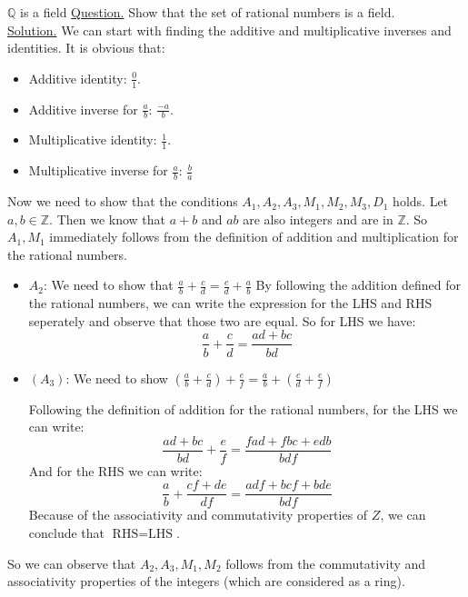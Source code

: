 \begin{example}{$ \mathbb{Q} $ is a field}
	\underline{Question.} Show that the set of rational numbers is a field.  \\
	
	\underline{Solution.} We can start with finding the additive and multiplicative inverses and identities. It is obvious that:
	\begin{itemize}
		\item Additive identity: $ \frac{0}{1} $.
		\item Additive inverse for $ \frac{a}{b}$: $ \frac{-a}{b} $.
		\item Multiplicative identity: $ \frac{1}{1} $.
		\item Multiplicative inverse for $ \frac{a}{b} $: $ \frac{b}{a} $
	\end{itemize}

	Now we need to show that the conditions $ A_1, A_2, A_3, M_1, M_2, M_3, D_1 $ holds.
	Let $ a,b \in \mathbb{Z} $. Then we know that $ a+b $ and $ ab $ are also integers and are in $ \mathbb{Z} $. So $ A_1, M_1 $ immediately follows from the definition of addition and multiplication for the rational numbers. 
	\begin{itemize}
		
		\item $ A_2 $: We need to show that $ \frac{a}{b} + \frac{c}{d} = \frac{c}{d} + \frac{a}{b} $
		By following the addition defined for the rational numbers, we can write the expression for the LHS and RHS seperately and observe that those two are equal. So for LHS we have:
		\[  \frac{a}{b} + \frac{c}{d} = \frac{ad + bc}{bd} \]
		
		\item $ (A_3) $: We need to show $ (\frac{a}{b} + \frac{c}{d}) + \frac{e}{f} = \frac{a}{b} + (\frac{c}{d} + \frac{e}{f})   $
		
		Following the definition of addition for the rational numbers, for the LHS we can write:
		\[ \frac{ad+bc}{bd} + \frac{e}{f} = \frac{fad + fbc + edb}{bdf} \]
		And for the RHS we can write:
		\[ \frac{a}{b} + \frac{cf + de}{df} = \frac{adf + bcf + bde}{bdf} \]
		Because of the associativity and commutativity properties of $ Z $, we can conclude that $ \text{RHS} = \text{LHS} $. 
		
		
	
	\end{itemize}

	So we can observe that $ A_2, A_3, M_1, M_2 $ follows from the commutativity and associativity properties of the integers (which are considered as a ring).
\end{example}


